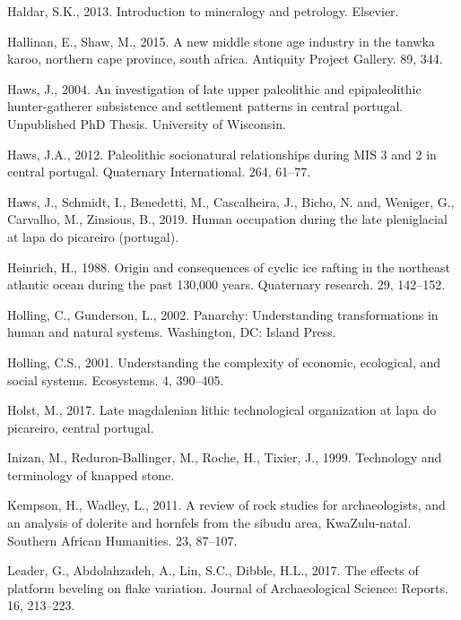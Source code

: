 \documentclass[12pt,twoside]{reedthesis}
\begin{document}
\leavevmode\hypertarget{ref-haldar2013}{}%
Haldar, S.K., 2013. Introduction to mineralogy and petrology. Elsevier.

\leavevmode\hypertarget{ref-hallinan2015}{}%
Hallinan, E., Shaw, M., 2015. A new middle stone age industry in the tanwka karoo, northern cape province, south africa. Antiquity Project Gallery. 89, 344.

\leavevmode\hypertarget{ref-haws2004}{}%
Haws, J., 2004. An investigation of late upper paleolithic and epipaleolithic hunter-gatherer subsistence and settlement patterns in central portugal. Unpublished PhD Thesis. University of Wisconsin.

\leavevmode\hypertarget{ref-haws2012}{}%
Haws, J.A., 2012. Paleolithic socionatural relationships during MIS 3 and 2 in central portugal. Quaternary International. 264, 61--77.

\leavevmode\hypertarget{ref-hawsetal2019}{}%
Haws, J., Schmidt, I., Benedetti, M., Cascalheira, J., Bicho, N. and, Weniger, G., Carvalho, M., Zinsious, B., 2019. Human occupation during the late pleniglacial at lapa do picareiro (portugal).

\leavevmode\hypertarget{ref-heinrich1988}{}%
Heinrich, H., 1988. Origin and consequences of cyclic ice rafting in the northeast atlantic ocean during the past 130,000 years. Quaternary research. 29, 142--152.

\leavevmode\hypertarget{ref-holling2002}{}%
Holling, C., Gunderson, L., 2002. Panarchy: Understanding transformations in human and natural systems. Washington, DC: Island Press.

\leavevmode\hypertarget{ref-holling2001}{}%
Holling, C.S., 2001. Understanding the complexity of economic, ecological, and social systems. Ecosystems. 4, 390--405.

\leavevmode\hypertarget{ref-holst2017}{}%
Holst, M., 2017. Late magdalenian lithic technological organization at lapa do picareiro, central portugal.

\leavevmode\hypertarget{ref-inizan1999}{}%
Inizan, M., Reduron-Ballinger, M., Roche, H., Tixier, J., 1999. Technology and terminology of knapped stone.

\leavevmode\hypertarget{ref-kempson2011}{}%
Kempson, H., Wadley, L., 2011. A review of rock studies for archaeologists, and an analysis of dolerite and hornfels from the sibudu area, KwaZulu-natal. Southern African Humanities. 23, 87--107.

\leavevmode\hypertarget{ref-leader2017}{}%
Leader, G., Abdolahzadeh, A., Lin, S.C., Dibble, H.L., 2017. The effects of platform beveling on flake variation. Journal of Archaeological Science: Reports. 16, 213--223.
\end{document}
